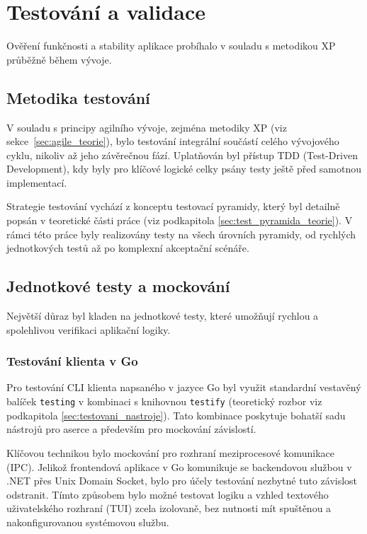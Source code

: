 \chapter{Testování a validace}
\label{chap:testovani}

Ověření funkčnosti a stability aplikace probíhalo v souladu s metodikou XP průběžně během vývoje.

\section{Metodika testování}
\label{sec:metodika_testovani}

V souladu s principy agilního vývoje, zejména metodiky XP (viz sekce~\ref{sec:agile_teorie}), bylo testování integrální součástí celého vývojového cyklu, nikoliv až jeho závěrečnou fází. Uplatňován byl přístup TDD (Test-Driven Development), kdy byly pro klíčové logické celky psány testy ještě před samotnou implementací.

Strategie testování vychází z konceptu testovací pyramidy, který byl detailně popsán v teoretické části práce (viz podkapitola \ref{sec:test_pyramida_teorie}). V rámci této práce byly realizovány testy na všech úrovních pyramidy, od rychlých jednotkových testů až po komplexní akceptační scénáře.

\section{Jednotkové testy a mockování}
\label{sec:unit_testing}

Největší důraz byl kladen na jednotkové testy, které umožňují rychlou a spolehlivou verifikaci aplikační logiky.

\subsection{Testování klienta v Go}
Pro testování CLI klienta napsaného v jazyce Go byl využit standardní vestavěný balíček \texttt{testing} v kombinaci s knihovnou \texttt{testify} (teoretický rozbor viz podkapitola \ref{sec:testovani_nastroje}). Tato kombinace poskytuje bohatší sadu nástrojů pro aserce a především pro mockování závislostí.

Klíčovou technikou bylo mockování pro rozhraní meziprocesové komunikace (IPC). Jelikož frontendová aplikace v Go komunikuje se backendovou službou v .NET přes Unix Domain Socket, bylo pro účely testování nezbytné tuto závislost odstranit. Tímto způsobem bylo možné testovat logiku a vzhled textového uživatelského rozhraní (TUI) zcela izolovaně, bez nutnosti mít spuštěnou a nakonfigurovanou systémovou službu.

